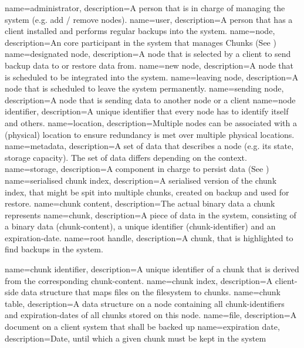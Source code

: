 {
    name={administrator},
    description={A person that is in charge of managing the system (e.g. add / remove nodes).}
}
{
    name={user},
    description={A person that has a \gls{client} installed and performs regular backups into the system.}
}
{
    name={node},
    description={An core participant in the system that manages \gls{Chunks} (See )}
}
{
    name={designated node},
    description={A \gls{node} that is selected by a \gls{client} to send backup data to or restore data from.}
}
{
    name={new node},
    description={A \gls{node} that is scheduled to be integrated into the system.}
}
{
    name={leaving node},
    description={A \gls{node} that is scheduled to leave the system permanently.}
}
{
    name={sending node},
    description={A \gls{node} that is sending data to another node or a client}
}
{
    name={node identifier},
    description={A unique identifier that every node has to identify itself and others.}
}
{
    name={location},
    description={Multiple nodes can be associated with a (physical) location to ensure redundancy is met over multiple physical locations.}
}
{
    name={metadata},
    description={A set of data that describes a node (e.g. its state, storage capacity). The set of data differs depending on the context.}
}
{
    name={storage},
    description={A component in charge to persist data (See )}
}
{
    name={serialised chunk index},
    description={A serialised version of the chunk index, that might be spit into multiple chunks, created on backup and used for restore.}
}
{
    name={chunk content},
    description={The actual binary data a chunk represents}
}
{
    name={chunk},
    description={A piece of data in the system, consisting of a binary data (\gls{chunk-content}), a unique identifier (\gls{chunk-identifier}) and an \gls{expiration-date}.}
}
{
    name={root handle},
    description={A chunk, that is highlighted to find backups in the system.}
}

{
    name={chunk identifier},
    description={A unique identifier of a \gls{chunk} that is derived from the corresponding \gls{chunk-content}.}
}
{
    name={chunk index},
    description={A \gls{client}-side data structure that maps files on the filesystem to chunks.}
}
{
    name={chunk table},
    description={A data structure on a \gls{node} containing all \gls{chunk-identifiers} and \glspl{expiration-date} of all \glspl{chunk} stored on this \gls{node}.}
}
{
    name={file},
    description={A document on a client system that shall be backed up}
}
{
    name={expiration date},
    description={Date, until which a given \gls{chunk} must be kept in the system}
}

